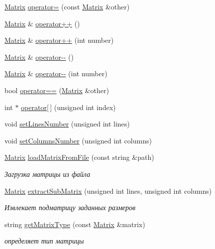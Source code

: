 \begin{DoxyCompactItemize}
\item 
\hyperlink{class_matrix}{Matrix} \hyperlink{class_matrix_a26d63d1bb523197df74a89be08a36cda}{operator=} (const \hyperlink{class_matrix}{Matrix} \&other)
\item 
\hyperlink{class_matrix}{Matrix} \& \hyperlink{class_matrix_a8507366342ab66e74b5a14226bf99791}{operator++} ()
\item 
\hyperlink{class_matrix}{Matrix} \& \hyperlink{class_matrix_a61760c9681e9d2d56db2119c48334da0}{operator++} (int number)
\item 
\hyperlink{class_matrix}{Matrix} \& \hyperlink{class_matrix_ad408cd4553ebed67bfd3fd5cc17f8423}{operator-\/-\/} ()
\item 
\hyperlink{class_matrix}{Matrix} \& \hyperlink{class_matrix_af0781e207002c53ba55d2f2609b3de05}{operator-\/-\/} (int number)
\item 
bool \hyperlink{class_matrix_a1e08ad098ff5d0a8022d5c735f01c4cb}{operator==} (\hyperlink{class_matrix}{Matrix} \&other)
\item 
int $\ast$ \hyperlink{class_matrix_a583f72a63d862f837281c1bc765a1cef}{operator\mbox{[}$\,$\mbox{]}} (unsigned int index)
\item 
void \hyperlink{class_matrix_a2ef1bcce25b5c796ac9dadf002c7ddbc}{set\-Lines\-Number} (unsigned int lines)
\item 
void \hyperlink{class_matrix_a8faf7bdf85069f6e15f16f854c28621b}{set\-Columns\-Number} (unsigned int columns)
\item 
\hyperlink{class_matrix}{Matrix} \hyperlink{class_matrix_aeef502e91c5f815b9a99525c0c55f741}{load\-Matrix\-From\-File} (const string \&path)
\begin{DoxyCompactList}\small\item\em Загрузка матрицы из файла \end{DoxyCompactList}\item 
\hyperlink{class_matrix}{Matrix} \hyperlink{class_matrix_aeaa460b51a3e8ba810c4caa86427429b}{extract\-Sub\-Matrix} (unsigned int lines, unsigned int columns)
\begin{DoxyCompactList}\small\item\em Извлекает подматрицу заданных размеров \end{DoxyCompactList}\item 
string \hyperlink{class_matrix_a0a730222578ce4b86e2166dfe8d402d2}{get\-Matrix\-Type} (const \hyperlink{class_matrix}{Matrix} \&matrix)
\begin{DoxyCompactList}\small\item\em определяет тип матрицы \end{DoxyCompactList}\item 

\end{DoxyCompactItemize}

